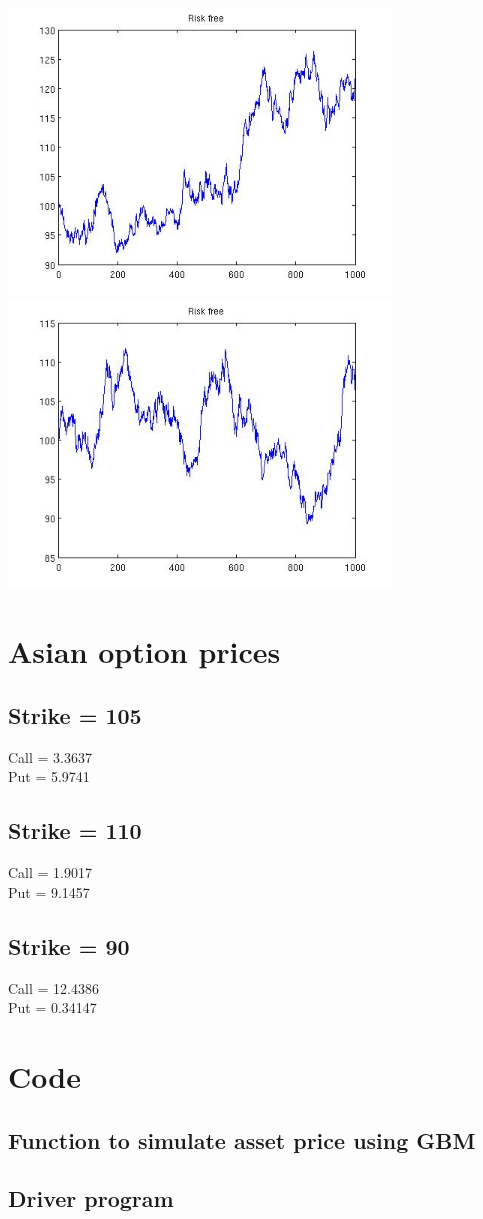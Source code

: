 \documentclass[12pt]{article}
\begin{document}
\begin{center}
    \includegraphics[width=4in]{riskfree9.jpg}
    \includegraphics[width=4in]{riskfree10.jpg}
  \end{center}

\newpage
\section{Asian option prices}
  \subsection*{Strike = 105}
    Call = 3.3637\\Put = 5.9741
  \subsection*{Strike = 110}
    Call = 1.9017\\Put = 9.1457
  \subsection*{Strike = 90}
    Call = 12.4386\\Put = 0.34147


\section{Code}
  \subsection{Function to simulate asset price using GBM}
    
  \subsection{Driver program}
    
\end{document}
